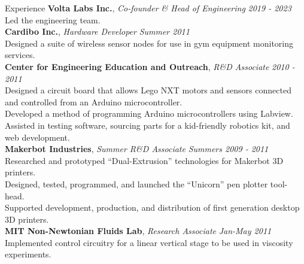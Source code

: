 \documentclass{resume} %
\begin{document}
\begin{rSection}{Experience}
{\bf Volta Labs Inc.}, {\em Co-founder \& Head of Engineering} \hfill {\em 2019 - 2023}
\\Led the engineering team.
\smallskip
\\{\bf Cardibo Inc.}, {\em Hardware Developer} \hfill {\em Summer 2011}
\\Designed a suite of wireless sensor nodes for use in gym equipment monitoring services.
\smallskip
\\{\bf Center for Engineering Education and Outreach}, {\em R\&D Associate} \hfill {\em 2010 - 2011}
\\Designed a circuit board that allows Lego NXT motors and sensors connected and controlled
from an Arduino microcontroller.
\\Developed a method of programming Arduino microcontrollers using Labview. Assisted in
testing software, sourcing parts for a kid-friendly robotics kit, and web development.
\smallskip
\\{\bf Makerbot Industries}, {\em Summer R\&D Associate} \hfill {\em Summers 2009 - 2011}
\\Researched and prototyped “Dual-Extrusion” technologies for Makerbot 3D printers.
\\Designed, tested, programmed, and launched the “Unicorn” pen plotter tool-head.
\\Supported development, production, and distribution of first generation desktop 3D printers.
\smallskip
\\{\bf MIT Non-Newtonian Fluids Lab}, {\em Research Associate} \hfill {\em Jan-May 2011}
\\Implemented control circuitry for a linear vertical stage to be used in viscosity experiments.

\end{rSection}
\end{document}
